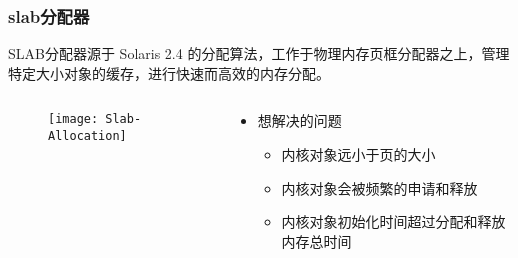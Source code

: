 \begin{frame}[plain,t]    
    \frametitle{slab分配器}

    SLAB分配器源于 Solaris 2.4 的分配算法，工作于物理内存页框分配器之上，管理特定大小对象的缓存，进行快速而高效的内存分配。
    \begin{columns}
        \begin{column}{0.5\textwidth}
          \begin{figure}
              \centering
              \texttt{[image: Slab-Allocation]}
          \end{figure}
        \end{column}
        \begin{column}{0.5\textwidth}
          \begin{itemize}
              \item 想解决的问题
              \begin{itemize}
                  \item 内核对象远小于页的大小
                  \item 内核对象会被频繁的申请和释放
                  \item 内核对象初始化时间超过分配和释放内存总时间
              \end{itemize}
          \end{itemize}
        \end{column}
    \end{columns}
\end{frame}
